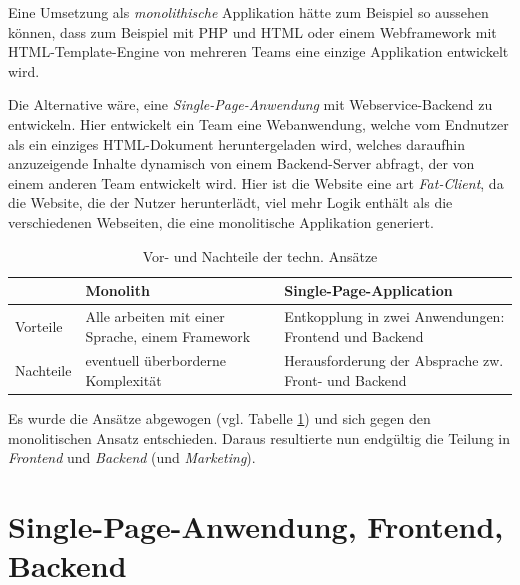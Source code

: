 \documentclass[a4paper, 11pt]{article}
\begin{document}
Eine Umsetzung als \emph{monolithische} Applikation hätte zum Beispiel so
aussehen können, dass zum Beispiel mit PHP und HTML oder einem Webframework mit
HTML-Template-Engine von mehreren Teams eine einzige Applikation entwickelt
wird.

Die Alternative wäre, eine \emph{Single-Page-Anwendung} mit Webservice-Backend
zu entwickeln. Hier entwickelt ein Team eine Webanwendung, welche vom Endnutzer
als ein einziges HTML-Dokument heruntergeladen wird, welches daraufhin
anzuzeigende Inhalte dynamisch von einem Backend-Server abfragt, der von einem
anderen Team entwickelt wird. Hier ist die Website eine art \emph{Fat-Client},
da die Website, die der Nutzer herunterlädt, viel mehr Logik enthält als die
verschiedenen Webseiten, die eine monolitische Applikation generiert.

\begin{table}
    \centering
    \begin{tabularx}{\textwidth}[htbp]{|l|X|X|}
        \hline
        \rowcolor[HTML]{E0E0E0}
        & \textbf{Monolith} & \textbf{Single-Page-Application}
        \\ \hline
        Vorteile & Alle arbeiten mit einer Sprache, einem Framework &
        Entkopplung in zwei Anwendungen: Frontend und Backend 
        \\ \hline
        Nachteile   &
        eventuell überborderne Komplexität
        &
        Herausforderung der Absprache zw. Front- und Backend
        \\ \hline
    \end{tabularx}
    \caption{Vor- und Nachteile der techn. Ansätze}
    \label{tab:pro_contra}
\end{table}

Es wurde die Ansätze abgewogen (vgl. Tabelle \ref{tab:pro_contra}) und sich
gegen den monolitischen Ansatz entschieden. Daraus resultierte nun endgültig
die Teilung in \emph{Frontend} und \emph{Backend} (und \emph{Marketing}).

\section{Single-Page-Anwendung, Frontend, Backend}
\end{document}
